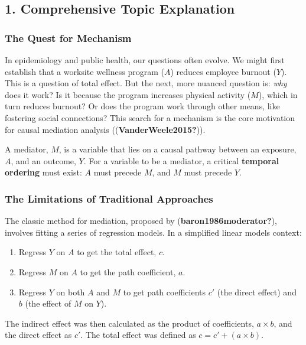 \documentclass[
  10pt,
  letterpaper,
  DIV=11,
  numbers=noendperiod,
  oneside]{scrartcl}
\providecommand{\tightlist}{%
  \setlength{\itemsep}{0pt}\setlength{\parskip}{0pt}}
\begin{document}
\subsection{1. Comprehensive Topic
Explanation}\label{comprehensive-topic-explanation}

\subsubsection{The Quest for Mechanism}\label{the-quest-for-mechanism}

In epidemiology and public health, our questions often evolve. We might
first establish that a worksite wellness program (\(A\)) reduces
employee burnout (\(Y\)). This is a question of total effect. But the
next, more nuanced question is: \emph{why} does it work? Is it because
the program increases physical activity (\(M\)), which in turn reduces
burnout? Or does the program work through other means, like fostering
social connections? This search for a mechanism is the core motivation
for causal mediation analysis ((\textbf{VanderWeele2015?})).

A mediator, \(M\), is a variable that lies on a causal pathway between
an exposure, \(A\), and an outcome, \(Y\). For a variable to be a
mediator, a critical \textbf{temporal ordering} must exist: \(A\) must
precede \(M\), and \(M\) must precede \(Y\).

\subsubsection{The Limitations of Traditional
Approaches}\label{the-limitations-of-traditional-approaches}

The classic method for mediation, proposed by
(\textbf{baron1986moderator?}), involves fitting a series of regression
models. In a simplified linear models context:

\begin{enumerate}
\def\labelenumi{\arabic{enumi}.}
\tightlist
\item
  Regress \(Y\) on \(A\) to get the total effect, \(c\).
\item
  Regress \(M\) on \(A\) to get the path coefficient, \(a\).
\item
  Regress \(Y\) on both \(A\) and \(M\) to get path coefficients \(c'\)
  (the direct effect) and \(b\) (the effect of \(M\) on \(Y\)).
\end{enumerate}

The indirect effect was then calculated as the product of coefficients,
\(a \times b\), and the direct effect as \(c'\). The total effect was
defined as \(c = c' + (a \times b)\).
\end{document}
